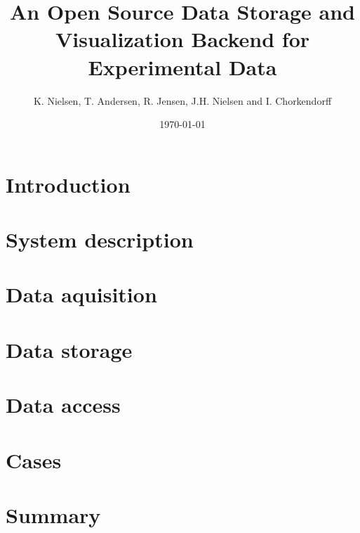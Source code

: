 \documentclass[12pt,draft]{article}
\title{An Open Source Data Storage and Visualization Backend for Experimental
Data}
\author{K. Nielsen, T. Andersen, R. Jensen, J.H. Nielsen and I. Chorkendorff}
\date{\today}
\begin{document}
\doublespacing %
\maketitle

\begin{abstract}

\end{abstract}

\section{Introduction}


\section{System description}


\section{Data aquisition}


\section{Data storage}\label{data_storage}


\section{Data access}\label{sec:data_access}


\section{Cases}


\section{Summary}




\end{document}
